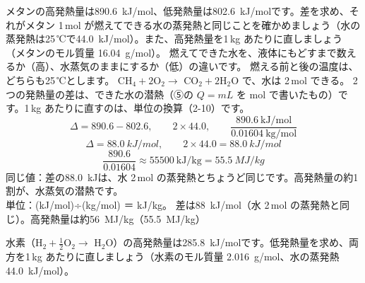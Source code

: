 \label{ph:熱-1:ex10}
\begin{phreidai}[高発熱量と低発熱量の差]
メタンの高発熱量は\qty{890.6}{kJ/mol}、低発熱量は\qty{802.6}{kJ/mol}です。差を求め、それがメタン 1\,mol が燃えてできる水の蒸発熱と同じことを確かめましょう（水の蒸発熱は25\,℃で\qty{44.0}{kJ/mol}）。また、高発熱量を1\,kg あたりに直しましょう（メタンのモル質量 \qty{16.04}{g/mol}）。
\phbamen
燃えてできた水を、液体にもどすまで数えるか（高）、水蒸気のままにするか（低）の違いです。
\phmushi
燃える前と後の温度は、どちらも25\,℃とします。
\phzu
CH$_4+2$O$_2\to$ CO$_2+2$H$_2$O で、水は 2\,mol できる。
\phriyu
2つの発熱量の差は、できた水の潜熱（⑤の $Q=mL$ を mol で書いたもの）です。1\,kg あたりに直すのは、単位の換算（2-10）です。
\phtateru
\[\Delta=890.6-802.6,\qquad 2\times44.0,\qquad \frac{890.6\ \text{kJ/mol}}{0.01604\ \text{kg/mol}}\]
\phtoku
\[\Delta=\qty{88.0}{kJ/mol},\qquad 2\times44.0=\qty{88.0}{kJ/mol}\]
\[\frac{890.6}{0.01604}\approx\num{55500}\ \text{kJ/kg}=\qty{55.5}{MJ/kg}\]
\phtashikame
同じ値：差の\qty{88.0}{kJ}は、水 2\,mol の蒸発熱とちょうど同じです。高発熱量の約1割が、水蒸気の潜熱です。\\
単位：(kJ/mol)÷(kg/mol) ＝ kJ/kg。
\kotae 差は\qty{88}{kJ/mol}（水 2\,mol の蒸発熱と同じ）。高発熱量は約\qty{56}{MJ/kg}（\qty{55.5}{MJ/kg}）
\end{phreidai}
\begin{jibun}
水素（H$_2+\tfrac{1}{2}$O$_2\to$ H$_2$O）の高発熱量は\qty{285.8}{kJ/mol}です。低発熱量を求め、両方を1\,kg あたりに直しましょう（水素のモル質量 \qty{2.016}{g/mol}、水の蒸発熱\qty{44.0}{kJ/mol}）。
\end{jibun}


